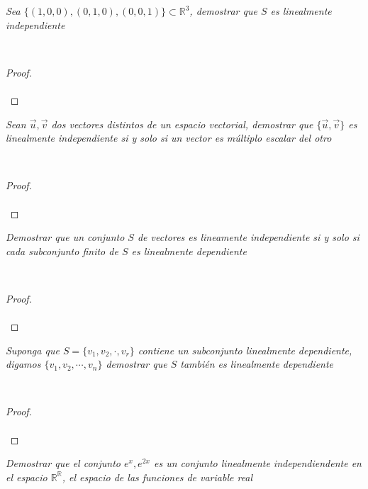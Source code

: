 \documentclass[11pt,letterpaper]{article}
\newcommand{\R}{\mathbb{R}}
\begin{document}
\begin{tcolorbox}[
	title = \textcolor{black}{\textcolor{white}{Problema 8}},]
\textit{Sea $\{(1,0,0),(0,1,0),(0,0,1)\}\subset \R^3$, demostrar que $S$ es linealmente independiente
}
\end{tcolorbox}\,\\
\begin{proof}\,\\
    \,\\
\end{proof}
\begin{tcolorbox}[
	title = \textcolor{black}{\textcolor{white}{Problema 9}},]
\textit{Sean $\vec{u},\vec{v}$ dos vectores distintos de un espacio vectorial, demostrar que $\{\vec{u},\vec{v}\}$
es linealmente independiente si y solo si un vector es m\'ultiplo escalar del otro
}
\end{tcolorbox}\,\\
\begin{proof}\,\\
    \,\\
\end{proof}
\begin{tcolorbox}[
	title = \textcolor{black}{\textcolor{white}{Problema 10}},]
\textit{Demostrar que un conjunto $S$ de vectores es lineamente independiente si y solo si cada subconjunto finito de $S$ es linealmente dependiente 
}
\end{tcolorbox}\,\\
\begin{proof}\,\\
    \,\\
\end{proof}
\begin{tcolorbox}[
	title = \textcolor{black}{\textcolor{white}{Problema 11}},]
\textit{Suponga que $S=\{v_1,v_2,\cdot,v_r\}$ contiene un subconjunto linealmente dependiente, digamos $\{v_1,v_2,\cdots,v_n\}$
demostrar que $S$ tambi\'en es linealmente dependiente
}
\end{tcolorbox}\,\\
\begin{proof}\,\\
    \,\\
\end{proof}
\begin{tcolorbox}[
	title = \textcolor{black}{\textcolor{white}{Problema 12}},]
\textit{Demostrar que el conjunto $e^x,e^{2x}$ es un conjunto linealmente independiendente en el espacio $\R^{\R}$, el espacio de 
las funciones de variable real
}
\end{tcolorbox}\,\\
\end{document}
